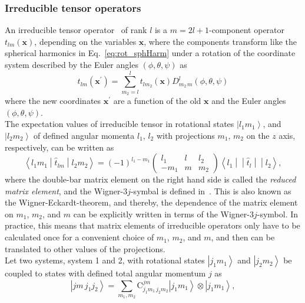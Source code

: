 \subsubsection*{Irreducible tensor operators}
An irreducible tensor operator~\cite{varshalovich1988} of rank $l$ is a $m=2l+1$-component operator $t_{lm}(\mathbf{x})$, depending on the variables $\mathbf{x}$, where the components transform like the spherical harmonics in Eq.~\eqref{eq:rot_sphHarm} under a rotation of the coordinate system described by the Euler angles $(\phi,\theta,\psi)$ as
\begin{equation}
t_{lm}(\mathbf{x}^\prime) = \sum_{m_2=l}^l t_{lm_2}(\mathbf{x}) D^l_{m_2\,m}(\phi,\theta,\psi)
\end{equation}
where the new coordinates $\mathbf{x}^\prime$ are a function of the old $\mathbf{x}$ and the Euler angles $(\phi,\theta,\psi)$.\\ 
The expectation values of irreducible tensor in rotational states $\left|l_1m_1\right>$, and $\left|l_2m_2\right>$ of defined angular momenta $l_1,\,l_2$ with projections $m_1,\,m_2$ on the $z$ axis, respectively, can be written as~\cite{varshalovich1988}
\begin{equation}
\label{app:wignerEckardt}
\left< l_1 m_1 \middle| \hat{t}_{lm} \middle| l_2 m_2\right>=
(-1)^{l_1-m_1}
\begin{pmatrix}
l_1 & l & l_2\\
-m_1 & m & m_2
\end{pmatrix}
\left<l_1 \middle|\middle| \hat{t}_{l} \middle|\middle| l_2\right>,
\end{equation}
where the double-bar matrix element on the right hand side is called the \textit{reduced matrix element}, and the Wigner-$3j$-symbal is defined in~\cite[Section 8.]{varshalovich1988}. This is also known as the Wigner-Eckardt-theorem, and thereby, the dependence of the matrix element on $m_1$, $m_2$, and $m$ can be explicitly written in terms of the Wigner-$3j$-symbol. In practice, this means that matrix elements of irreducible operators only have to be calculated once for a convenient  choice of $m_1$, $m_2$, and $m$, and then can be translated to other values of the projections.\\[9pt]
Let two systems, system 1 and 2, with rotational states $\left|j_1m_1\right>$ and $\left| j_2m_2\right>$ be  coupled to states with defined total angular momentum $j$ as
\begin{equation}
\left|jm\,j_1j_2\right> = \sum_{m_1,m_2}\text{C}^{jm}_{j_1m_1\,j_2m_2}
\left|j_1m_1\right>\otimes\left| j_1m_1\right>,
\end{equation}

